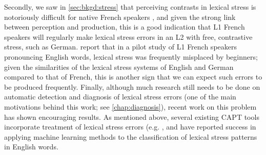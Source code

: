 %
Secondly, we saw in \cref{sec:bkgd:stress} that perceiving contrasts in lexical stress is notoriously difficult for native French speakers \citep{Cutler2005,Dupoux2008}, and given the strong link between perception and production,
this is a good indication that L1 French speakers will regularly make lexical stress errors in an L2 with free, contrastive stress, such as German. \textcite{Bonneau2011} report that in a pilot study of L1 French speakers pronouncing English words, lexical stress was frequently misplaced by beginners; given the similarities of the lexical stress systems of English and German compared to that of French, this is another sign that we can expect such errors to be produced frequently.
%
%	
%
Finally, although much research still needs to be done on automatic detection and diagnosis of lexical stress errors (one of the main motivations behind this work; see \cref{chap:diagnosis}), recent work on this problem has shown encouraging results. As mentioned above, several existing CAPT tools incorporate treatment of lexical stress errors (e.g. \cite{Wik2009,Bonneau2011}, and \textcite{Shahin2012a,Kim2011} have reported success in applying machine learning methods to the classification of lexical stress patterns in English words. 





